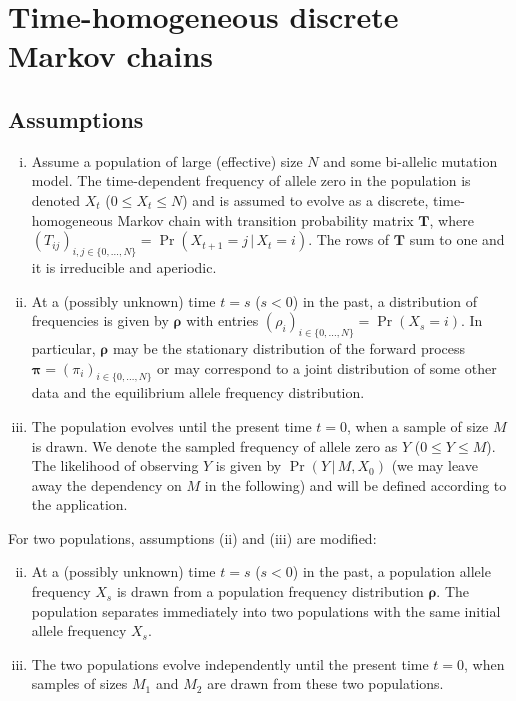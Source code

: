 \documentclass[preprint]{elsarticle}
\newcommand{\bs}[1]{\ensuremath{\boldsymbol{#1}}}
\newcommand\given{{\,|\,}}
\newcommand\x[1]{\ensuremath{X_{#1}}}
\newcommand\y{\ensuremath{Y}}
\newcommand\s{\ensuremath{s}}
\begin{document}
\section{Time-homogeneous discrete Markov chains}

\subsection{Assumptions}\label{section:assumptions}
\begin{enumerate}[(i)]
\item Assume a population of large (effective) size $N$ and some bi-allelic mutation model. The time-dependent frequency of allele zero in the population is denoted $\x{t}$ ($0 \le \x{t} \le N$) and is assumed to evolve as a discrete, time-homogeneous Markov chain with transition probability matrix $\mathbf{T}$, where $(T_{ij})_{i,j \in \{0, \ldots, N\}} = \Pr(\x{t+1}=j \given \x{t}=i)$.  The rows of $\mathbf{T}$ sum to one and it is irreducible and aperiodic.
\item At a (possibly unknown) time $t=\s$ ($\s<0$) in the past, a distribution of frequencies is given by $\bs{\rho}$ with entries $(\rho_{i})_{i \in \{0, \ldots, N\}} = \Pr(\x{\s}=i)$.  In particular, $\bs{\rho}$ may be the stationary distribution of the forward process $\bs{\pi}=(\pi_i)_{i \in \{0, \ldots, N\}}$ or may correspond to a joint distribution of some other data and the equilibrium allele frequency distribution. 
\item The population evolves until the present time $t=0$, when a sample of size $M$ is drawn.  We denote the sampled frequency of allele zero as $\y$ ($0 \le \y \le M$). The likelihood of observing $\y$ is given by $\Pr(\y \given M, \x{0})$ (we may leave away the dependency on $M$ in the following) and will be defined according to the application.
\end{enumerate}

For two populations, assumptions (ii) and (iii) are modified:
\begin{enumerate}[(i)]
\setcounter{enumi}{1}
\item At a (possibly unknown) time $t=\s$ ($\s<0$) in the past, a population allele frequency $\x{\s}$ is drawn from a population frequency distribution $\bs{\rho}$. The population separates immediately into two populations with the same initial allele frequency $\x{\s}$. 
\item The two populations evolve independently until the present time $t=0$, when samples of sizes $M_1$ and $M_2$ are drawn from these two populations.
\end{enumerate}
\end{document}
